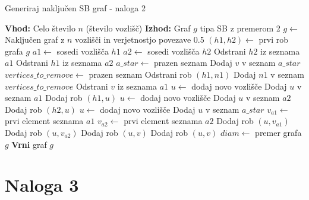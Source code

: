 \documentclass{article}
\begin{document}
\begin{algorithm}
    \caption{Generiraj naključen SB graf - naloga 2}
    \begin{algorithmic}[1]
    \State \textbf{Vhod:} Celo število $n$ (število vozlišč)
    \State \textbf{Izhod:} Graf $g$ tipa SB z premerom 2
    \State $g \gets$ Naključen graf z $n$ vozlišči in verjetnostjo povezave 0.5
    \State $(h1, h2) \gets$ prvi rob grafa $g$
    \State $a1 \gets$ sosedi vozlišča $h1$
    \State $a2 \gets$ sosedi vozlišča $h2$
    \State Odstrani $h2$ iz seznama $a1$
    \State Odstrani $h1$ iz seznama $a2$
    \State $a\_star \gets$ prazen seznam
            \State Dodaj $v$ v seznam $a\_star$
        \EndIf
    \EndFor
    \State $vertices\_to\_remove \gets$ prazen seznam
                \State Odstrani rob $(h1, n1)$
                \State Dodaj $n1$ v seznam $vertices\_to\_remove$
            \EndIf
        \EndFor
    \EndFor
        \State Odstrani $v$ iz seznama $a1$
    \EndFor
        \State $u \gets$ dodaj novo vozlišče
        \State Dodaj $u$ v seznam $a1$
        \State Dodaj rob $(h1, u)$
    \EndIf
        \State $u \gets$ dodaj novo vozlišče
        \State Dodaj $u$ v seznam $a2$
        \State Dodaj rob $(h2, u)$
    \EndIf
        \State $u \gets$ dodaj novo vozlišče
        \State Dodaj $u$ v seznam $a\_star$
        \State $v_{a1} \gets$ prvi element seznama $a1$
        \State $v_{a2} \gets$ prvi element seznama $a2$
        \State Dodaj rob $(u, v_{a1})$
        \State Dodaj rob $(u, v_{a2})$
    \EndIf
            \State Dodaj rob $(u, v)$
        \EndFor
    \EndFor
            \State Dodaj rob $(u, v)$
        \EndFor
    \EndFor
    \State $diam \gets$ premer grafa $g$
        \State \textbf{Vrni} graf $g$
    \EndIf
    \end{algorithmic}
    \end{algorithm}
    

\section{Naloga 3}
\end{document}
